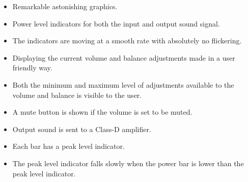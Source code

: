 \begin{itemize}
\item Remarkable astonishing graphics.
\item Power level indicators for both the input and output sound signal. 
\item The indicators are moving at a smooth rate with absolutely no flickering.
\item Displaying the current volume and balance adjustments made in a user friendly way.
\item Both the minimum and maximum level of adjustments available to the volume and balance is visible to the user.
\item A mute button is shown if the volume is set to be muted.
\item Output sound is sent to a Class-D amplifier.
\item Each bar has a peak level indicator.
\item The peak level indicator falls slowly when the power bar is lower than the peak level indicator.
\end{itemize}